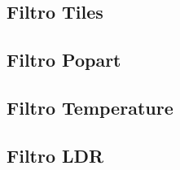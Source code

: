 \documentclass[a4paper,10pt,twoside]{article}
\begin{document}
%
\newpage

%

\subsection{Filtro Tiles}

%
\newpage
\subsection{Filtro Popart}

%
\newpage

%

\subsection{Filtro Temperature}

%
\newpage

%

%

\subsection{Filtro LDR}

%
\newpage

%
\end{document}
